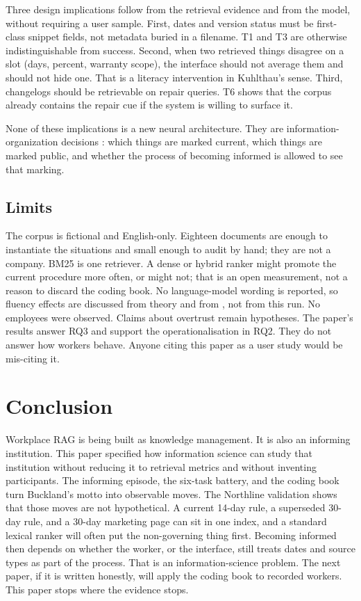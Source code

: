 \documentclass{isi2027}
\begin{document}
Three design implications follow from the retrieval evidence and from the model, without requiring a user sample. First, dates and version status must be first-class snippet fields, not metadata buried in a filename. T1 and T3 are otherwise indistinguishable from success. Second, when two retrieved things disagree on a slot (days, percent, warranty scope), the interface should not average them and should not hide one. That is a literacy intervention in Kuhlthau's sense. Third, changelogs should be retrievable on repair queries. T6 shows that the corpus already contains the repair cue if the system is willing to surface it.

None of these implications is a new neural architecture. They are information-organization decisions \citep{Buckland1991}: which things are marked current, which things are marked public, and whether the process of becoming informed is allowed to see that marking.

\subsection{Limits}

The corpus is fictional and English-only. Eighteen documents are enough to instantiate the situations and small enough to audit by hand; they are not a company. BM25 is one retriever. A dense or hybrid ranker might promote the current procedure more often, or might not; that is an open measurement, not a reason to discard the coding book. No language-model wording is reported, so fluency effects are discussed from theory and from \citet{Gorichanaz2025}, not from this run. No employees were observed. Claims about overtrust remain hypotheses. The paper's results answer RQ3 and support the operationalisation in RQ2. They do not answer how workers behave. Anyone citing this paper as a user study would be mis-citing it.

\section{Conclusion}

Workplace RAG is being built as knowledge management. It is also an informing institution. This paper specified how information science can study that institution without reducing it to retrieval metrics and without inventing participants. The informing episode, the six-task battery, and the coding book turn Buckland's motto into observable moves. The Northline validation shows that those moves are not hypothetical. A current 14-day rule, a superseded 30-day rule, and a 30-day marketing page can sit in one index, and a standard lexical ranker will often put the non-governing thing first. Becoming informed then depends on whether the worker, or the interface, still treats dates and source types as part of the process. That is an information-science problem. The next paper, if it is written honestly, will apply the coding book to recorded workers. This paper stops where the evidence stops.
\end{document}
